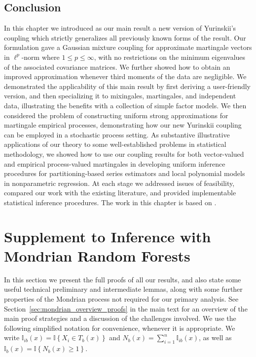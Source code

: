 \documentclass[11pt,lof]{puthesis}
\newcommand{\I}{\ensuremath{\mathbb{I}}}
\theoremstyle{break}
\theoremstyle{proof}
\begin{document}
\section{Conclusion}
\label{sec:yurinskii_conclusion}

In this chapter we introduced as our main result a new version of Yurinskii's
coupling which strictly generalizes all previously known forms of the result.
Our formulation gave a Gaussian mixture coupling for approximate martingale
vectors in $\ell^p$-norm where $1 \leq p \leq \infty$, with no restrictions on
the minimum eigenvalues of the associated covariance matrices. We further
showed how to obtain an improved approximation whenever third moments of the
data are negligible. We demonstrated the applicability of this main result by
first deriving a user-friendly version, and then specializing it to mixingales,
martingales, and independent data, illustrating the benefits with a collection
of simple factor models. We then considered the problem of constructing uniform
strong approximations for martingale empirical processes, demonstrating how our
new Yurinskii coupling can be employed in a stochastic process setting. As
substantive illustrative applications of our theory to some
well-established problems in statistical methodology, we showed how to use our
coupling results for both vector-valued and empirical process-valued
martingales in developing uniform inference procedures for partitioning-based
series estimators and local polynomial models in nonparametric regression. At
each stage we addressed issues of feasibility, compared our work with the
existing literature, and provided implementable statistical inference
procedures. The work in this chapter is based on \citet{cattaneo2022yurinskii}.

\appendix

\chapter{Supplement to Inference with Mondrian Random Forests}
\label{app:mondrian}

In this section we present the full proofs of all our results,
and also state some useful technical preliminary and
intermediate lemmas, along with some further properties
of the Mondrian process not required for our primary analysis.
See Section~\ref{sec:mondrian_overview_proofs} in the main text
for an overview of the main proof strategies and a discussion of
the challenges involved.
We use the following simplified notation for convenience,
whenever it is appropriate.
We write $\I_{i b}(x) = \I \left\{ X_i \in T_b(x) \right\}$
and $N_b(x) = \sum_{i=1}^{n} \I_{i b}(x)$,
as well as $\I_b(x) = \I \left\{ N_b(x) \geq 1 \right\}$.
\end{document}
